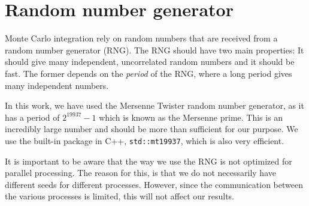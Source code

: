 \section{Random number generator}
Monte Carlo integration rely on random numbers that are received from a random number generator (RNG). The RNG should have two main properties: It should give many independent, uncorrelated random numbers and it should be fast. The former depends on the \textit{period} of the RNG, where a long period gives many independent numbers. 

In this work, we have used the Mersenne Twister random number generator, as it has a period of $2^{19937}-1$ which is known as the Mersenne prime. This is an incredibly large number and should be more than sufficient for our purpose. We use the built-in package in C++, \lstinline|std::mt19937|, which is also very efficient. 

It is important to be aware that the way we use the RNG is not optimized for parallel processing. The reason for this, is that we do not necessarily have different seeds for different processes. However, since the communication between the various processes is limited, this will not affect our results. 